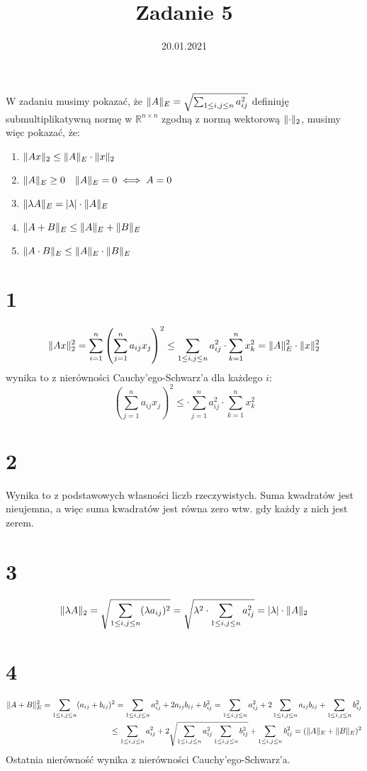 \documentclass{article}
\title{Zadanie 5}
\date{20.01.2021}
\DeclarePairedDelimiter{\norm}{\lVert}{\rVert}
\begin{document}
\maketitle
W zadaniu musimy pokazać, że $\norm{A}_E = \sqrt{\sum_{1\leq i,j \leq n} a_{ij}^2}$ definiuję submultiplikatywną normę w $\mathbb{R}^{n \times n}$ zgodną z normą wektorową $\norm{\cdot}_2$, musimy \\więc pokazać, że:
\begin{enumerate}
   \item $\norm{Ax}_2 \leq \norm{A}_E \cdot \norm{x}_2$
   \item $\norm{A}_E \geq 0 \quad \norm{A}_E = 0 \iff A = 0$
   \item $\norm{\lambda A}_E = |\lambda| \cdot \norm{A}_E$
   \item $\norm{A+B}_E \leq \norm{A}_E + \norm{B}_E$
   \item $\norm{A\cdot B}_E \leq \norm{A}_E \cdot \norm{B}_E$
\end{enumerate}
\section{1}
$$
\norm{Ax}_2^2 = \sum_{i=1}^n \left(\sum_{j=1}^n a_{ij} x_j \right)^2 \leq \sum_{1 \leq i,j \leq n} a_{ij}^2 \cdot \sum_{k=1}^n x^2_k  = \norm{A}_E^2 \cdot \norm{x}_2^2
$$
wynika to z nierówności Cauchy'ego-Schwarz'a dla każdego $i$:
$$
\left ( \sum_{j=1}^n a_{ij} x_j \right)^2 \leq  \cdot \sum_{j=1}^n a_{ij}^2 \cdot \sum_{k=1}^n x^2_k
$$
\section{2}
Wynika to z podstawowych własności liczb rzeczywistych. Suma kwadratów jest nieujemna, a więc suma kwadratów jest równa zero wtw. gdy każdy z nich jest zerem.
\section{3}
$$
\norm{\lambda A}_2 = \sqrt{\sum_{1\leq i,j \leq n} (\lambda a_{ij})^2} = \sqrt{\lambda^2 \cdot \sum_{1\leq i,j \leq n} a_{ij}^2} = |\lambda|\cdot \norm{A}_2
$$
\section{4}
\begin{align*}
\norm{A+B}_E^2 = \sum_{1\leq i,j \leq n} (a_{ij}+b_{ij})^2 = \sum_{1\leq i,j \leq n} a_{ij}^2+ 2a_{ij}b_{ij} + b_{ij}^2
=  \sum_{1\leq i,j \leq n} a_{ij}^2 +  2\sum_{1\leq i,j \leq n} a_{ij}b_{ij} +  \sum_{1\leq i,j \leq n} b_{ij}^2 \\\leq \sum_{1\leq i,j \leq n} a_{ij}^2 +  2\sqrt{\sum_{1\leq i,j \leq n} a_{ij}^2  \sum_{1\leq i,j \leq n} b_{ij}^2} +  \sum_{1\leq i,j \leq n} b_{ij}^2 = (\norm{A}_E + \norm{B}_E)^2
\end{align*}
Ostatnia nierówność wynika z nierówności Cauchy'ego-Schwarz'a.
\end{document}
